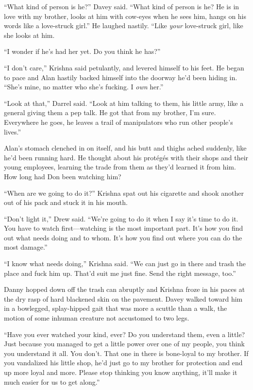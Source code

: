 ``What kind of person is he?'' Davey said.  ``What kind of person is
he?  He is in love with my brother, looks at him with cow-eyes when he
sees him, hangs on his words like a love-struck girl.'' He laughed
nastily.  ``Like \textit{your} love-struck girl, like she looks at
him.

``I wonder if he's had her yet.  Do you think he has?''

``I don't care,'' Krishna said petulantly, and levered himself to his
feet.  He began to pace and Alan hastily backed himself into the
doorway he'd been hiding in.  ``She's mine, no matter who she's
fucking.  I \textit{own} her.''

``Look at that,'' Darrel said.  ``Look at him talking to them, his
little army, like a general giving them a pep talk.  He got that from
my brother, I'm sure.  Everywhere he goes, he leaves a trail of
manipulators who run other people's lives.''

Alan's stomach clenched in on itself, and his butt and thighs ached
suddenly, like he'd been running hard.  He thought about his
prot\'{e}g\'{e}s with their shops and their young employees, learning
the trade from them as they'd learned it from him.  How long had Don
been watching him?

``When are we going to do it?'' Krishna spat out his cigarette and
shook another out of his pack and stuck it in his mouth.

``Don't light it,'' Drew said.  ``We're going to do it when I say it's
time to do it.  You have to watch first---watching is the most
important part.  It's how you find out what needs doing and to whom. 
It's how you find out where you can do the most damage.''

``I know what needs doing,'' Krishna said.  ``We can just go in there
and trash the place and fuck him up.  That'd suit me just fine.  Send
the right message, too.''

Danny hopped down off the trash can abruptly and Krishna froze in his
paces at the dry rasp of hard blackened skin on the pavement.  Davey
walked toward him in a bowlegged, splay-hipped gait that was more a
scuttle than a walk, the motion of some inhuman creature not
accustomed to two legs.

``Have you ever watched your kind, ever?  Do you understand them, even
a little?  Just because you managed to get a little power over one of
my people, you think you understand it all.  You don't.  That one in
there is bone-loyal to my brother.  If you vandalized his little shop,
he'd just go to my brother for protection and end up more loyal and
more.  Please stop thinking you know anything, it'll make it much
easier for us to get along.''

